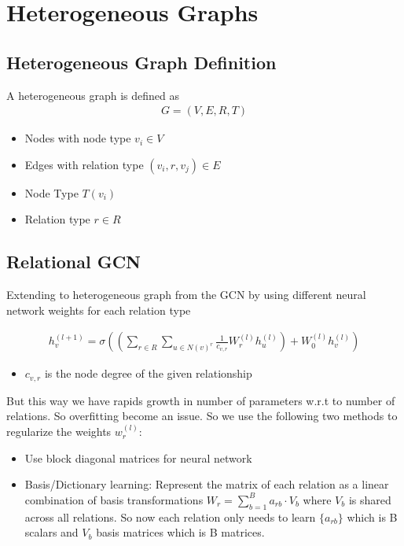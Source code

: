 \chapter{Heterogeneous Graphs}
\section{Heterogeneous Graph Definition}
A heterogeneous graph is defined as 
    \begin{align*}
        G = (V, E, R, T)
    \end{align*}
    \begin{itemize}
        \item Nodes with node type $v_i \in V$
        \item Edges with relation type $(v_i, r, v_j) \in E$
        \item Node Type $T(v_i)$
        \item Relation type $r\in R$
    \end{itemize}

\section{Relational GCN}
Extending to heterogeneous graph from the GCN by using different neural network weights for each relation type

\begin{align*}
    h_v^{(l+1)} = \sigma \left( \left(\sum_{r\in R} \sum_{u \in N(v)^r} \frac{1}{c_{v,r}} W_r^{(l)}h_u^{(l)}\right) + W_0^{(l)}h_v^{(l)} \right)
\end{align*}
    \begin{itemize}
        \item $c_{v,r}$ is the node degree of the given relationship
    \end{itemize}
But this way we have rapids growth in number of parameters w.r.t to number of relations. So overfitting become an issue. So we use the following two methods to regularize the weights $w_r^{(l)}$: 
    \begin{itemize}
        \item Use block diagonal matrices for neural network 
        \item Basis/Dictionary learning: Represent the matrix of each relation as a linear combination of basis transformations $W_r = \sum_{b=1}^B a_{rb} \cdot V_b$ where $V_b$ is shared across all relations. So now each relation only needs to learn $\{ a_{rb} \}$ which is B scalars and $V_b$ basis matrices which is B matrices. 
    \end{itemize}
    
